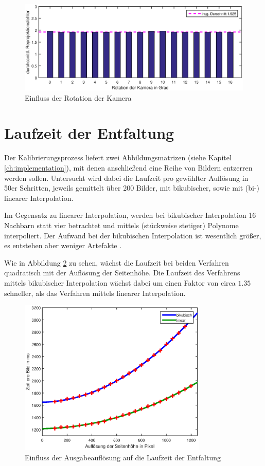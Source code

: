 \begin{figure}[!htb]
	\centering
	\includegraphics[width=\textwidth]{images/reprojectionErrorDeg3.eps}
	\caption{Einfluss der Rotation der Kamera}
	\label{fig:influenceRot}
\end{figure}


\section{Laufzeit der Entfaltung}
Der Kalibrierungsprozess liefert zwei Abbildungsmatrizen (siehe Kapitel \ref{ch:implementation}), mit denen anschließend eine Reihe von Bildern entzerren werden sollen. Untersucht wird dabei die Laufzeit pro gewählter Auflösung in 50er Schritten, jeweils gemittelt über 200 Bilder, mit bikubischer, sowie mit (bi-) linearer Interpolation.

Im Gegensatz zu linearer Interpolation, werden bei bikubischer Interpolation 16 Nachbarn statt vier betrachtet und mittels (stückweise stetiger) Polynome interpoliert. Der Aufwand bei der bikubischen Interpolation ist wesentlich größer, es entstehen aber weniger Artefakte \cite{Keys1981}.

Wie in Abbildung \ref{fig:influenceRes2} zu sehen, wächst die Laufzeit bei beiden Verfahren quadratisch mit der Auflösung der Seitenhöhe. Die Laufzeit des Verfahrens mittels bikubischer Interpolation wächst dabei um einen Faktor von circa $1.35$ schneller, als das Verfahren mittels linearer Interpolation.

\begin{figure}[!htb]
	\centering
	\includegraphics[width=0.8\textwidth]{images/runningTimePerSlantheight.eps}
	\caption{Einfluss der Ausgabeauflösung auf die Laufzeit der Entfaltung}
	\label{fig:influenceRes2}
\end{figure}


